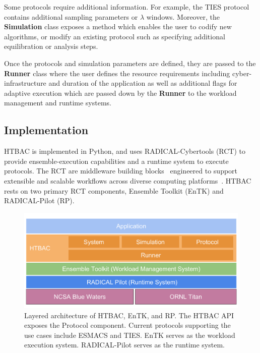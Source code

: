 Some protocols require additional information. For 
example, the TIES protocol contains additional sampling parameters or   
$\lambda$ windows. Moreover, the \textbf{Simulation} class exposes a 
method which enables the user to codify new algorithms, or modify
an existing protocol such as specifying additional equilibration or analysis 
steps. 

Once the protocols and simulation parameters 
are defined, they are passed to the \textbf{Runner} class where the user defines 
the resource requirements including cyber-infrastructure and duration of the 
application as well as additional flags for adaptive execution which are passed 
down by the \textbf{Runner} to the workload management and runtime systems. 


\subsection{Implementation}

HTBAC is implemented in Python, and uses RADICAL-Cybertools (RCT) to provide 
ensemble-execution capabilities and a runtime system to execute protocols. 
The RCT are middleware building blocks~\cite{review_bb_2016} engineered to 
support extensible and scalable workflows across diverse computing
platforms~\cite{turilli2017comprehensive}. HTBAC rests on two primary RCT 
components, Ensemble Toolkit (EnTK) and RADICAL-Pilot (RP). 

\begin{figure}
  \centering
   \includegraphics[width=\columnwidth]{figures/building_blocks.pdf}
  \caption{Layered architecture of HTBAC, EnTK, and RP. The HTBAC API exposes 
  the Protocol component. Current protocols supporting the use cases include 
  ESMACS and TIES. EnTK serves as the workload execution system. RADICAL-Pilot 
  serves as the runtime system.}
\label{fig:blockdiagram}
\end{figure}

